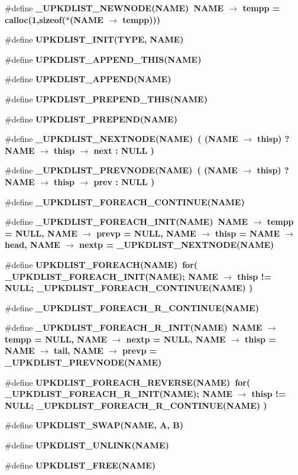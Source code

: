 \begin{CompactItemize}
\item 
\#define \bf{\_\-UPKDLIST\_\-NEWNODE}(NAME)~NAME $\rightarrow$ tempp = calloc(1,sizeof($\ast$(NAME $\rightarrow$ tempp)))
\item 
\#define \bf{UPKDLIST\_\-INIT}(TYPE, NAME)
\item 
\#define \bf{UPKDLIST\_\-APPEND\_\-THIS}(NAME)
\item 
\#define \bf{UPKDLIST\_\-APPEND}(NAME)
\item 
\#define \bf{UPKDLIST\_\-PREPEND\_\-THIS}(NAME)
\item 
\#define \bf{UPKDLIST\_\-PREPEND}(NAME)
\item 
\#define \bf{\_\-UPKDLIST\_\-NEXTNODE}(NAME)~( (NAME $\rightarrow$ thisp) ? NAME $\rightarrow$ thisp $\rightarrow$ next : NULL )
\item 
\#define \bf{\_\-UPKDLIST\_\-PREVNODE}(NAME)~( (NAME $\rightarrow$ thisp) ? NAME $\rightarrow$ thisp $\rightarrow$ prev : NULL )
\item 
\#define \bf{\_\-UPKDLIST\_\-FOREACH\_\-CONTINUE}(NAME)
\item 
\#define \bf{\_\-UPKDLIST\_\-FOREACH\_\-INIT}(NAME)~NAME $\rightarrow$ tempp = NULL, NAME $\rightarrow$ prevp = NULL, NAME $\rightarrow$ thisp = NAME $\rightarrow$ head, NAME $\rightarrow$ nextp = \_\-UPKDLIST\_\-NEXTNODE(NAME)
\item 
\#define \bf{UPKDLIST\_\-FOREACH}(NAME)~for( \_\-UPKDLIST\_\-FOREACH\_\-INIT(NAME); NAME $\rightarrow$ thisp != NULL; \_\-UPKDLIST\_\-FOREACH\_\-CONTINUE(NAME) )
\item 
\#define \bf{\_\-UPKDLIST\_\-FOREACH\_\-R\_\-CONTINUE}(NAME)
\item 
\#define \bf{\_\-UPKDLIST\_\-FOREACH\_\-R\_\-INIT}(NAME)~NAME $\rightarrow$ tempp = NULL, NAME $\rightarrow$ nextp = NULL, NAME $\rightarrow$ thisp = NAME $\rightarrow$ tail, NAME $\rightarrow$ prevp = \_\-UPKDLIST\_\-PREVNODE(NAME)
\item 
\#define \bf{UPKDLIST\_\-FOREACH\_\-REVERSE}(NAME)~for( \_\-UPKDLIST\_\-FOREACH\_\-R\_\-INIT(NAME); NAME $\rightarrow$ thisp != NULL; \_\-UPKDLIST\_\-FOREACH\_\-R\_\-CONTINUE(NAME) )
\item 
\#define \bf{UPKDLIST\_\-SWAP}(NAME, A, B)
\item 
\#define \bf{UPKDLIST\_\-UNLINK}(NAME)
\item 
\#define \bf{UPKDLIST\_\-FREE}(NAME)
\end{CompactItemize}
